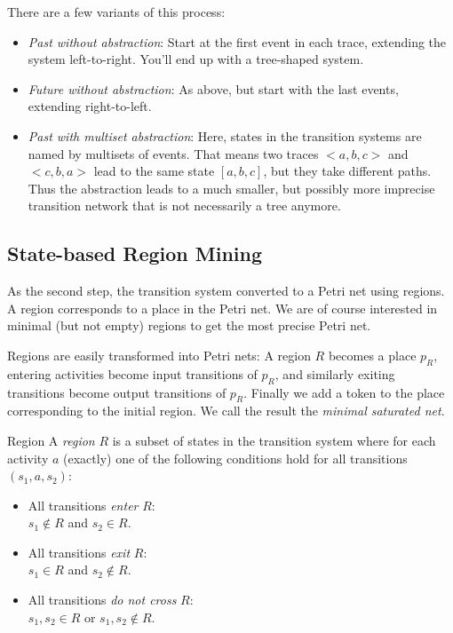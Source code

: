\documentclass[english]{panikzettel}
\begin{document}
There are a few variants of this process:
\begin{itemize}
    \item \emph{Past without abstraction}: Start at the first event in each trace, extending the system left-to-right. You'll end up with a tree-shaped system.
    \item \emph{Future without abstraction}: As above, but start with the last events, extending right-to-left.
    \item \emph{Past with multiset abstraction}: Here, states in the transition systems are named by multisets of events. That means two traces $<a,b,c>$ and $<c,b,a>$ lead to the same state $[a,b,c]$, but they take different paths. Thus the abstraction leads to a much smaller, but possibly more imprecise transition network that is not necessarily a tree anymore.
\end{itemize}

\subsection{State-based Region Mining}

\begin{halfboxl}
As the second step, the transition system converted to a Petri net using regions.
A region corresponds to a place in the Petri net.
We are of course interested in minimal (but not empty) regions to get the most precise Petri net.

Regions are easily transformed into Petri nets: A region $R$ becomes a place $p_R$, entering activities become input transitions of $p_R$, and similarly exiting transitions become output transitions of $p_R$.
Finally we add a token to the place corresponding to the initial region.
We call the result the \emph{minimal saturated net}.
\end{halfboxl}%
\begin{halfboxr}
\vspace{-\baselineskip}
\begin{defi}{Region}
A \emph{region} $R$ is a subset of states in the transition system where for each activity $a$ (exactly) one of the following conditions hold for all transitions $(s_1, a, s_2)$:
\begin{itemize}
    \item All transitions \emph{enter} $R$: \\
          $s_1 \notin R$ and $s_2 \in R$.
    \item All transitions \emph{exit} $R$: \\
          $s_1 \in R$ and $s_2 \notin R$.
    \item All transitions \emph{do not cross} $R$: \\
          $s_1, s_2 \in R$ or $s_1, s_2 \notin R$.
\end{itemize}
\end{defi}
\end{halfboxr}
\end{document}
